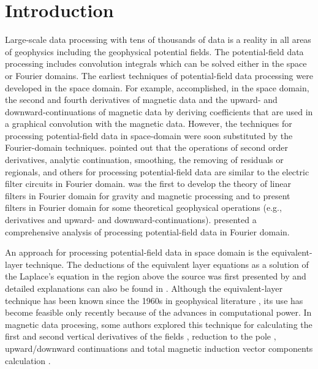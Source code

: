 \documentclass[manuscript]{geophysics}
\begin{document}
\section{Introduction}

Large-scale data processing with tens of thousands of data is a reality in all areas of geophysics including the geophysical potential fields. 
The potential-field data processing includes convolution integrals which can be solved either in the space or Fourier domains.
The earliest techniques of potential-field data processing  were developed in the space domain.
For example, \cite{Peters1949} accomplished, in the space domain, the second and fourth derivatives of magnetic data and the upward- and downward-continuations of magnetic data by deriving coefficients that are
used in a  graphical convolution with the magnetic data.
However, the techniques for  processing potential-field data in space-domain were soon substituted by the Fourier-domain techniques. 
\cite{Dean1958} pointed out that the operations of second order derivatives, analytic continuation, smoothing, the removing of residuals or regionals, and others for processing  potential-field data are
similar to the electric filter circuits in Fourier domain.
\cite{Dean1958} was the first to develop the theory of linear filters in Fourier domain for gravity and magnetic processing and to present filters in Fourier domain \citep[][ see Table I, p 113]{Dean1958} 
for some theoretical geophysical operations (e.g., derivatives and upward- and downward-continuations).
\cite{GUNN1975} presented a comprehensive analysis of processing potential-field data in Fourier domain.


An approach for processing potential-field data in space domain is the equivalent-layer technique.
The deductions of the equivalent layer equations as a solution of the Laplace's equation in the region above the source was first presented by \cite{kellogg1929} and detailed explanations can also be found in \cite{blakely1996}. 
Although the equivalent-layer technique  has been known since the 1960s in geophysical literature \citep{danes1961structure,bott1967solution,dampney1969}, its use has become feasible only recently 
because of the advances in computational power.
In magnetic data procesing, some authors explored this technique for calculating the first and second vertical derivatives of the fields \citep{emilia1973}, reduction to the pole \citep{silva1986,oliveirajr-etal2013,li2014using}, upward/downward continuations \citep{hansen-miyazaki1984,li-oldenburg2010} and total magnetic induction vector components calculation \citep{sun2019constrained}.
\end{document}
